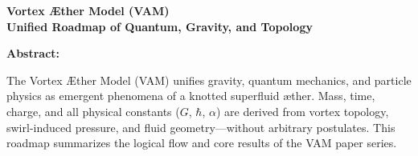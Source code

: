 \documentclass{article}
\begin{document}
    \begin{center}
    {\Huge\bfseries Vortex Æther Model (VAM)}\\[3pt]
    {\large\bfseries Unified Roadmap of Quantum, Gravity, and Topology}
    \end{center}
    \vspace{0.4cm}

    \noindent
    \textbf{Abstract:}
    \begin{spacing}{1.08}
        \noindent
        The Vortex Æther Model (VAM) unifies gravity, quantum mechanics, and particle physics as emergent phenomena of a knotted superfluid æther. Mass, time, charge, and all physical constants ($G$, $\hbar$, $\alpha$) are derived from vortex topology, swirl-induced pressure, and fluid geometry—without arbitrary postulates. This roadmap summarizes the logical flow and core results of the VAM paper series.
    \end{spacing}
    \vspace{0.4cm}
\end{document}
